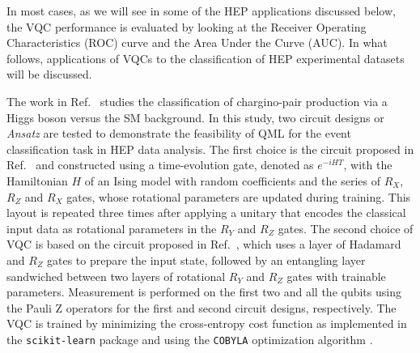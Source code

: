 In most cases, as we will see in some of the HEP applications discussed below, the VQC performance is evaluated by looking at the Receiver Operating Characteristics (ROC) curve and the Area Under the Curve (AUC). In what follows, applications of VQCs to the classification of HEP experimental datasets will be discussed.

The work in Ref.~\cite{Terashi2021} studies the classification of chargino-pair production via a Higgs boson versus the SM background.
In this study, two circuit designs or \emph{Ansatz} are tested to demonstrate the feasibility of QML for the event classification task in HEP data analysis.
The first choice is the circuit proposed in Ref.~\cite{Mitarai2018} and constructed using a time-evolution gate, denoted as $e^{-iHT}$, with the Hamiltonian $H$ of an Ising model with random coefficients and the series of $R_{X}$, $R_{Z}$ and $R_{X}$ gates, whose rotational parameters are updated during training.
This layout is repeated three times after applying a unitary that encodes the classical input data as rotational parameters in the $R_{Y}$ and $R_{Z}$ gates. The second choice of VQC is based on the circuit proposed in Ref.~\cite{Havlek2019}, which uses a layer of Hadamard and $R_{Z}$ gates to prepare the input state, followed by an entangling layer sandwiched between two layers of rotational $R_{Y}$ and $R_{Z}$ gates with trainable parameters. 
Measurement is performed on the first two and all the qubits using the Pauli Z operators for the first and second circuit designs, respectively.
The VQC is trained by minimizing the cross-entropy cost function as implemented in the \texttt{scikit-learn} package \cite{scikit-learn} and using the \texttt{COBYLA} optimization algorithm \cite{Powell1994}. 

